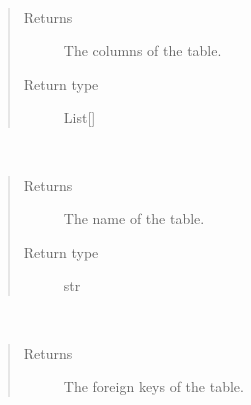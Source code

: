 \documentclass[letterpaper,10pt,english]{sphinxmanual}
\begin{document}
\begin{fulllineitems}
\begin{fulllineitems}
\label{\detokenize{model:simple_sql.model.table.Table.get_columns}}~\begin{quote}\begin{description}
\item[{Returns}] \leavevmode
\sphinxAtStartPar
The columns of the table.

\item[{Return type}] \leavevmode
\sphinxAtStartPar
List{[}{\hyperref[\detokenize{model:simple_sql.model.column.Column}]{}}{]}

\end{description}\end{quote}

\end{fulllineitems}


\begin{fulllineitems}
\label{\detokenize{model:simple_sql.model.table.Table.get_name}}~\begin{quote}\begin{description}
\item[{Returns}] \leavevmode
\sphinxAtStartPar
The name of the table.

\item[{Return type}] \leavevmode
\sphinxAtStartPar
str

\end{description}\end{quote}

\end{fulllineitems}


\begin{fulllineitems}
\label{\detokenize{model:simple_sql.model.table.Table.get_references}}~\begin{quote}\begin{description}
\item[{Returns}] \leavevmode
\sphinxAtStartPar
The foreign keys of the table.


\end{description}
\end{quote}
\end{fulllineitems}
\end{fulllineitems}
\end{document}
